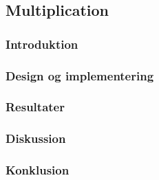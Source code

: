 \subsection{Multiplication}

\subsubsection{Introduktion}

\subsubsection{Design og implementering}

\subsubsection{Resultater}

\subsubsection{Diskussion}

\subsubsection{Konklusion}